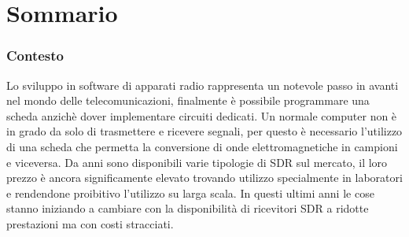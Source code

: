 \chapter*{Sommario} %
\label{sommario}




\subsection{Contesto}
Lo sviluppo in software di apparati radio rappresenta un notevole passo in avanti nel mondo delle telecomunicazioni, finalmente è possibile programmare una scheda anzichè dover implementare circuiti dedicati. Un normale computer non è in grado da solo di trasmettere e ricevere segnali, per questo è necessario l'utilizzo di una scheda che permetta la conversione di onde elettromagnetiche in campioni e viceversa.
Da anni sono disponibili varie tipologie di SDR sul mercato, il loro prezzo è ancora significamente elevato trovando utilizzo specialmente in laboratori e rendendone proibitivo l'utilizzo su larga scala. In questi ultimi anni le cose stanno iniziando a cambiare con la disponibilità di ricevitori SDR a ridotte prestazioni ma con costi stracciati.
